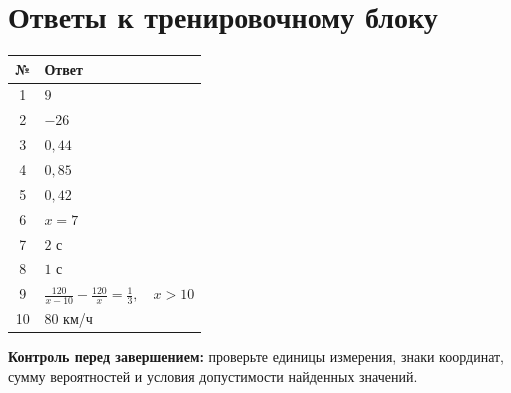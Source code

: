 \documentclass[a4paper,12pt]{article}
\begin{document}
\section*{Ответы к тренировочному блоку}
\vspace{5mm}
\renewcommand{\arraystretch}{1.50}
\begin{tabularx}{\linewidth}{@{}c X@{}}
\toprule
№ & Ответ\\
\midrule
1 & $9$\\
2 & $-26$\\
3 & $0{,}44$\\
4 & $0{,}85$\\
5 & $0{,}42$\\
6 & $x=7$\\
7 & $2$ с\\
8 & $1$ с\\
9 & $\displaystyle\frac{120}{x-10}-\frac{120}{x}=\frac13,\quad x>10$\\
10 & $80$ км/ч\\
\bottomrule
\end{tabularx}
\vfill
\textcolor{muted}{\small \textbf{Контроль перед завершением:} проверьте единицы измерения, знаки координат, сумму вероятностей и условия допустимости найденных значений.}
\end{document}

